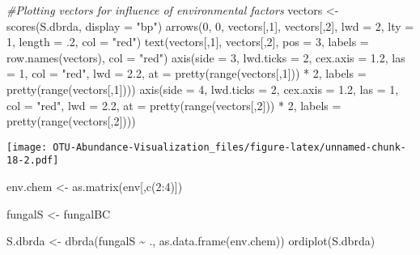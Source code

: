 \documentclass[
]{article}
\newenvironment{Shaded}{\begin{snugshade}}{\end{snugshade}}
\newcommand{\AttributeTok}[1]{\textcolor[rgb]{0.77,0.63,0.00}{#1}}
\newcommand{\CommentTok}[1]{\textcolor[rgb]{0.56,0.35,0.01}{\textit{#1}}}
\newcommand{\DecValTok}[1]{\textcolor[rgb]{0.00,0.00,0.81}{#1}}
\newcommand{\FloatTok}[1]{\textcolor[rgb]{0.00,0.00,0.81}{#1}}
\newcommand{\FunctionTok}[1]{\textcolor[rgb]{0.00,0.00,0.00}{#1}}
\newcommand{\NormalTok}[1]{#1}
\newcommand{\OtherTok}[1]{\textcolor[rgb]{0.56,0.35,0.01}{#1}}
\newcommand{\SpecialCharTok}[1]{\textcolor[rgb]{0.00,0.00,0.00}{#1}}
\newcommand{\StringTok}[1]{\textcolor[rgb]{0.31,0.60,0.02}{#1}}
\begin{document}
\begin{Shaded}
\begin{Highlighting}[]
\CommentTok{\#Plotting vectors for influence of environmental factors}
\NormalTok{vectors }\OtherTok{\textless{}{-}} \FunctionTok{scores}\NormalTok{(S.dbrda, }\AttributeTok{display =} \StringTok{"bp"}\NormalTok{)}
\FunctionTok{arrows}\NormalTok{(}\DecValTok{0}\NormalTok{, }\DecValTok{0}\NormalTok{, vectors[,}\DecValTok{1}\NormalTok{], vectors[,}\DecValTok{2}\NormalTok{],}
       \AttributeTok{lwd =} \DecValTok{2}\NormalTok{, }\AttributeTok{lty =} \DecValTok{1}\NormalTok{, }\AttributeTok{length =}\NormalTok{ .}\DecValTok{2}\NormalTok{, }\AttributeTok{col =} \StringTok{"red"}\NormalTok{)}
\FunctionTok{text}\NormalTok{(vectors[,}\DecValTok{1}\NormalTok{], vectors[,}\DecValTok{2}\NormalTok{], }\AttributeTok{pos =} \DecValTok{3}\NormalTok{, }
     \AttributeTok{labels =} \FunctionTok{row.names}\NormalTok{(vectors), }\AttributeTok{col =} \StringTok{"red"}\NormalTok{)}
\FunctionTok{axis}\NormalTok{(}\AttributeTok{side =} \DecValTok{3}\NormalTok{, }\AttributeTok{lwd.ticks =} \DecValTok{2}\NormalTok{, }\AttributeTok{cex.axis =} \FloatTok{1.2}\NormalTok{, }\AttributeTok{las =} \DecValTok{1}\NormalTok{, }\AttributeTok{col =} \StringTok{"red"}\NormalTok{, }\AttributeTok{lwd =} \FloatTok{2.2}\NormalTok{,}
     \AttributeTok{at =} \FunctionTok{pretty}\NormalTok{(}\FunctionTok{range}\NormalTok{(vectors[,}\DecValTok{1}\NormalTok{])) }\SpecialCharTok{*} \DecValTok{2}\NormalTok{, }\AttributeTok{labels =} \FunctionTok{pretty}\NormalTok{(}\FunctionTok{range}\NormalTok{(vectors[,}\DecValTok{1}\NormalTok{])))}
\FunctionTok{axis}\NormalTok{(}\AttributeTok{side =} \DecValTok{4}\NormalTok{, }\AttributeTok{lwd.ticks =} \DecValTok{2}\NormalTok{, }\AttributeTok{cex.axis =} \FloatTok{1.2}\NormalTok{, }\AttributeTok{las =} \DecValTok{1}\NormalTok{, }\AttributeTok{col =} \StringTok{"red"}\NormalTok{, }\AttributeTok{lwd =} \FloatTok{2.2}\NormalTok{,}
     \AttributeTok{at =} \FunctionTok{pretty}\NormalTok{(}\FunctionTok{range}\NormalTok{(vectors[,}\DecValTok{2}\NormalTok{])) }\SpecialCharTok{*} \DecValTok{2}\NormalTok{, }\AttributeTok{labels =} \FunctionTok{pretty}\NormalTok{(}\FunctionTok{range}\NormalTok{(vectors[,}\DecValTok{2}\NormalTok{])))}
\end{Highlighting}
\end{Shaded}

\texttt{[image: OTU-Abundance-Visualization\_files/figure-latex/unnamed-chunk-18-2.pdf]}

\begin{Shaded}
\begin{Highlighting}[]
\NormalTok{env.chem }\OtherTok{\textless{}{-}} \FunctionTok{as.matrix}\NormalTok{(env[,}\FunctionTok{c}\NormalTok{(}\DecValTok{2}\SpecialCharTok{:}\DecValTok{4}\NormalTok{)])}

\NormalTok{fungalS }\OtherTok{\textless{}{-}}\NormalTok{ fungalBC}

\NormalTok{S.dbrda }\OtherTok{\textless{}{-}} \FunctionTok{dbrda}\NormalTok{(fungalS }\SpecialCharTok{\textasciitilde{}}\NormalTok{ ., }\FunctionTok{as.data.frame}\NormalTok{(env.chem))}
\FunctionTok{ordiplot}\NormalTok{(S.dbrda)}
\end{Highlighting}
\end{Shaded}
\end{document}
